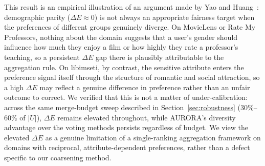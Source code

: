 \documentclass[a4paper,fleqn]{cas-dc}
\begin{document}
This result is an empirical illustration of an argument made by Yao and
Huang~\citeyearpar{yao_new_2017}: demographic parity ($\Delta E \approx 0$) is not
always an appropriate fairness target when the preferences of different
groups genuinely diverge. On MovieLens or Rate My Professors, nothing
about the domain suggests that a user's gender should influence how much
they enjoy a film or how highly they rate a professor's teaching, so a
persistent $\Delta E$ gap there is plausibly attributable to the
aggregation rule. On libimseti, by contrast, the sensitive attribute
enters the preference signal itself through the structure of romantic and
social attraction, so a high $\Delta E$ may reflect a genuine difference
in preference rather than an unfair outcome to correct. We verified that
this is not a matter of under-calibration: across the same merge-budget
sweep described in Section~\ref{sec:robustness} (30\%--60\% of $|U|$),
$\Delta E$ remains elevated throughout, while AURORA's diversity advantage
over the voting methods persists regardless of budget. We view the
elevated $\Delta E$ as a genuine limitation of a single-ranking
aggregation framework on domains with reciprocal, attribute-dependent
preferences, rather than a defect specific to our coarsening method.
\end{document}
